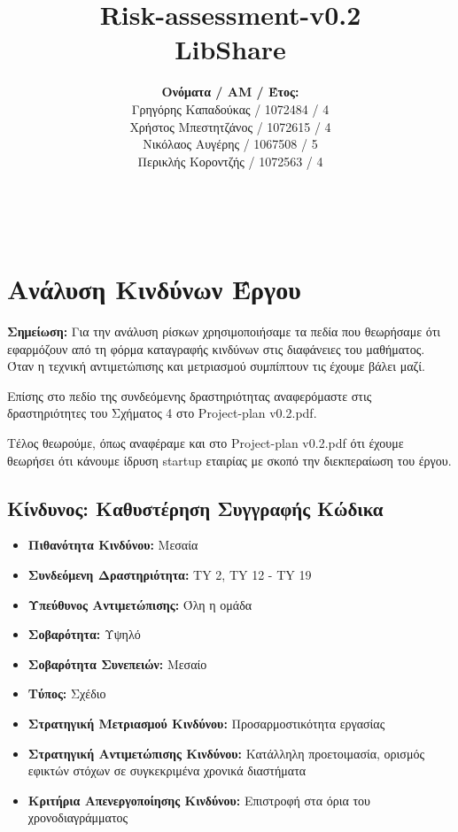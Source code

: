 \documentclass[12pt,a4paper]{article}
\title{Risk-assessment-v0.2\\ LibShare}
\author{\textbf{Ονόματα / ΑΜ / Έτος:} \\ Γρηγόρης Καπαδούκας / 1072484 / 4\textdegree \\ Χρήστος Μπεστητζάνος / 1072615 / 4\textdegree \\ Νικόλαος Αυγέρης / 1067508 / 5\textdegree \\ Περικλής Κοροντζής / 1072563 / 4\textdegree}
\begin{document}
\makeatletter
\begin{center}
	\LARGE{\@title} \\
	\pagebreak
    \begin{LARGE}\@author\end{LARGE}
    \pagebreak
\end{center}

\section{Ανάλυση Κινδύνων Έργου}

\textbf{Σημείωση:} Για την ανάλυση ρίσκων χρησιμοποιήσαμε τα πεδία που θεωρήσαμε ότι εφαρμόζουν από τη φόρμα καταγραφής κινδύνων στις διαφάνειες του μαθήματος. Όταν η τεχνική αντιμετώπισης και μετριασμού συμπίπτουν τις έχουμε βάλει μαζί.

Επίσης στο πεδίο της συνδεόμενης δραστηριότητας αναφερόμαστε στις δραστηριότητες του Σχήματος 4 στο Project-plan v0.2.pdf.

Τέλος θεωρούμε, όπως αναφέραμε και στο Project-plan v0.2.pdf ότι έχουμε θεωρήσει ότι κάνουμε ίδρυση startup εταιρίας με σκοπό την διεκπεραίωση του έργου.

\subsection{Κίνδυνος: Καθυστέρηση Συγγραφής Κώδικα}
\begin{itemize}
	\item \textbf{Πιθανότητα Κινδύνου:} Μεσαία
	\item \textbf{Συνδεόμενη Δραστηριότητα:} TY 2, TY 12 - TY 19
	\item \textbf{Υπεύθυνος Αντιμετώπισης:} Όλη η ομάδα
	\item \textbf{Σοβαρότητα:} Υψηλό
	\item \textbf{Σοβαρότητα Συνεπειών:} Μεσαίο
	\item \textbf{Τύπος:} Σχέδιο
	\item \textbf{Στρατηγική Μετριασμού Κινδύνου:} Προσαρμοστικότητα εργασίας
	\item \textbf{Στρατηγική Αντιμετώπισης Κινδύνου:} Κατάλληλη προετοιμασία, ορισμός εφικτών στόχων σε συγκεκριμένα χρονικά διαστήματα
	\item \textbf{Κριτήρια Απενεργοποίησης Κινδύνου:} Επιστροφή στα όρια του χρονοδιαγράμματος
\end{itemize}
\end{document}
